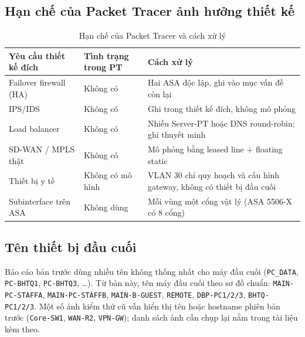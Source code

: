 \subsection{Hạn chế của Packet Tracer ảnh hưởng thiết kế}
\begin{small}
\setlength{\tabcolsep}{4pt}
\begin{longtable}{|p{3.4cm}|p{2.8cm}|p{7.4cm}|}
\caption{Hạn chế của Packet Tracer và cách xử lý} \label{tab:pt_limits} \\
\hline
\textbf{Yêu cầu thiết kế đích} & \textbf{Tình trạng trong PT} & \textbf{Cách xử lý} \\ \hline
\endhead
Failover firewall (HA) & Không có & Hai ASA độc lập, ghi vào mục vấn đề còn lại \\ \hline
IPS/IDS & Không có & Ghi trong thiết kế đích, không mô phỏng \\ \hline
Load balancer & Không có & Nhiều Server-PT hoặc DNS round-robin; ghi thuyết minh \\ \hline
SD-WAN / MPLS thật & Không có & Mô phỏng bằng leased line + floating static \\ \hline
Thiết bị y tế & Không có mô hình & VLAN 30 chỉ quy hoạch và cấu hình gateway, không có thiết bị đầu cuối \\ \hline
Subinterface trên ASA & Không dùng & Mỗi vùng một cổng vật lý (ASA 5506-X có 8 cổng) \\ \hline
\end{longtable}
\end{small}

\subsection{Tên thiết bị đầu cuối}
Báo cáo bản trước dùng nhiều tên không thống nhất cho máy đầu cuối (\texttt{PC\_DATA}, \texttt{PC-BHTQ1}, \texttt{PC-BHTQ3}, \dots). Từ bản này, tên máy đầu cuối theo sơ đồ chuẩn: \texttt{MAIN-PC-STAFFA}, \texttt{MAIN-PC-STAFFB}, \texttt{MAIN-B-GUEST}, \texttt{REMOTE}, \texttt{DBP-PC1/2/3}, \texttt{BHTQ-PC1/2/3}. Một số ảnh kiểm thử cũ vẫn hiển thị tên hoặc hostname phiên bản trước (\texttt{Core-SW1}, \texttt{WAN-R2}, \texttt{VPN-GW}); danh sách ảnh cần chụp lại nằm trong tài liệu kèm theo.


